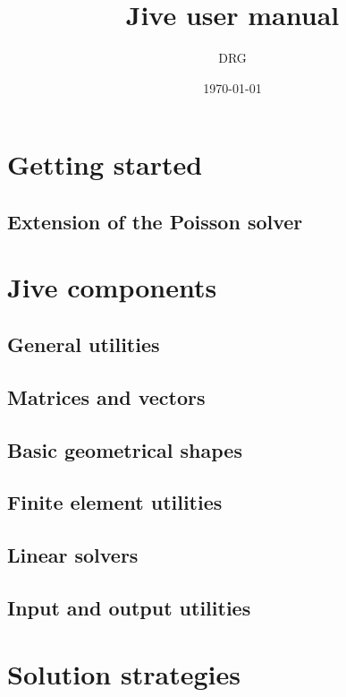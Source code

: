 \documentclass[a4paper,12pt,english]{book}
\title{Jive user manual}
\author{ DRG }
\date{\today}
\begin{document}
\maketitle





\part{Getting started}





\chapter{Extension of the Poisson solver}
\label{chapter:extended-poisson-solver}


\part{Jive components}

\chapter{General utilities}
\label{chapter:utilities}

\chapter{Matrices and vectors}
\label{chapter:matrices}

\chapter{Basic geometrical shapes}
\label{chapter:geom}

\chapter{Finite element utilities}
\label{chapter:fem}

\chapter{Linear solvers}
\label{chapter:solvers}

\chapter{Input and output utilities}
\label{chapter:io}


\part{Solution strategies}
\end{document}
